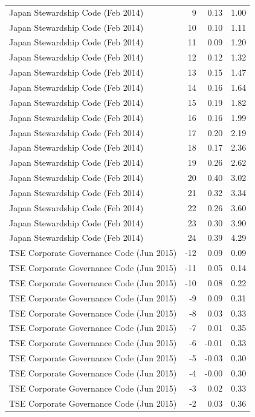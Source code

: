 \begin{table}
\begin{tabular}{lrrr}
Japan Stewardship Code (Feb 2014) & 9 & 0.13 & 1.00 \\
Japan Stewardship Code (Feb 2014) & 10 & 0.10 & 1.11 \\
Japan Stewardship Code (Feb 2014) & 11 & 0.09 & 1.20 \\
Japan Stewardship Code (Feb 2014) & 12 & 0.12 & 1.32 \\
Japan Stewardship Code (Feb 2014) & 13 & 0.15 & 1.47 \\
Japan Stewardship Code (Feb 2014) & 14 & 0.16 & 1.64 \\
Japan Stewardship Code (Feb 2014) & 15 & 0.19 & 1.82 \\
Japan Stewardship Code (Feb 2014) & 16 & 0.16 & 1.99 \\
Japan Stewardship Code (Feb 2014) & 17 & 0.20 & 2.19 \\
Japan Stewardship Code (Feb 2014) & 18 & 0.17 & 2.36 \\
Japan Stewardship Code (Feb 2014) & 19 & 0.26 & 2.62 \\
Japan Stewardship Code (Feb 2014) & 20 & 0.40 & 3.02 \\
Japan Stewardship Code (Feb 2014) & 21 & 0.32 & 3.34 \\
Japan Stewardship Code (Feb 2014) & 22 & 0.26 & 3.60 \\
Japan Stewardship Code (Feb 2014) & 23 & 0.30 & 3.90 \\
Japan Stewardship Code (Feb 2014) & 24 & 0.39 & 4.29 \\
TSE Corporate Governance Code (Jun 2015) & -12 & 0.09 & 0.09 \\
TSE Corporate Governance Code (Jun 2015) & -11 & 0.05 & 0.14 \\
TSE Corporate Governance Code (Jun 2015) & -10 & 0.08 & 0.22 \\
TSE Corporate Governance Code (Jun 2015) & -9 & 0.09 & 0.31 \\
TSE Corporate Governance Code (Jun 2015) & -8 & 0.03 & 0.33 \\
TSE Corporate Governance Code (Jun 2015) & -7 & 0.01 & 0.35 \\
TSE Corporate Governance Code (Jun 2015) & -6 & -0.01 & 0.33 \\
TSE Corporate Governance Code (Jun 2015) & -5 & -0.03 & 0.30 \\
TSE Corporate Governance Code (Jun 2015) & -4 & -0.00 & 0.30 \\
TSE Corporate Governance Code (Jun 2015) & -3 & 0.02 & 0.33 \\
TSE Corporate Governance Code (Jun 2015) & -2 & 0.03 & 0.36 \\

\end{tabular}
\end{table}
